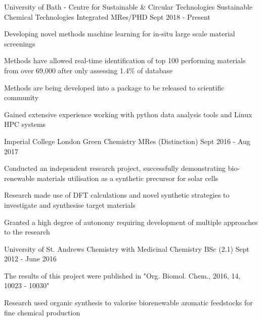 
\begin{cventries}

  \cventry
    {University of Bath - Centre for Sustainable \& Circular Technologies} %
    {Sustainable Chemical Technologies} %
    {Integrated MRes/PHD} %
    {Sept 2018 - Present} %
    {
      \begin{cvitems} %
      \item Developing novel methods machine learning for in-situ large scale material screenings
      \item Methods have allowed real-time identification of top 100 performing materials from over 69,000 after only assessing 1.4\% of database
      \item Methods are being developed into a package to be released to scientific community
      \item Gained extensive experience working with python data analysis tools and Linux HPC systems
      \end{cvitems}
    }

  \cventry
    {Imperial College London} %
    {Green Chemistry} %
    {MRes (Distinction)} %
    {Sept 2016 - Aug 2017} %
    {
      \begin{cvitems} %
      \item Conducted an independent research project, successfully demonstrating bio-renewable materials utilisation as a synthetic precursor for solar cells
      \item Research made use of DFT calculations and novel synthetic strategies to investigate and synthesise target materials
      \item Granted a high degree of autonomy requiring development of multiple approaches to the research
      \end{cvitems}
    }

  \cventry
    {University of St. Andrews} %
    {Chemistry with Medicinal Chemistry} %
    {BSc (2.1)} %
    {Sept 2012 - June 2016} %
    {
      \begin{cvitems} %
      \item The results of this project were published in "Org. Biomol. Chem., 2016, 14, 10023 - 10030"
      \item Research used organic synthesis to valorise biorenewable aromatic feedstocks for fine chemical production
      \end{cvitems}
    }


\end{cventries}
